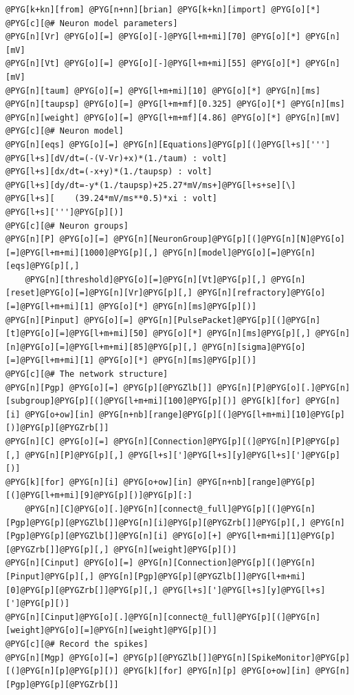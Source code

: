 \documentclass[letterpaper,10pt,english]{manual}
\begin{document}
\begin{Verbatim}[commandchars=@\[\]]
@PYG[k+kn][from] @PYG[n+nn][brian] @PYG[k+kn][import] @PYG[o][*]
@PYG[c][@# Neuron model parameters]
@PYG[n][Vr] @PYG[o][=] @PYG[o][-]@PYG[l+m+mi][70] @PYG[o][*] @PYG[n][mV]
@PYG[n][Vt] @PYG[o][=] @PYG[o][-]@PYG[l+m+mi][55] @PYG[o][*] @PYG[n][mV]
@PYG[n][taum] @PYG[o][=] @PYG[l+m+mi][10] @PYG[o][*] @PYG[n][ms]
@PYG[n][taupsp] @PYG[o][=] @PYG[l+m+mf][0.325] @PYG[o][*] @PYG[n][ms]
@PYG[n][weight] @PYG[o][=] @PYG[l+m+mf][4.86] @PYG[o][*] @PYG[n][mV]
@PYG[c][@# Neuron model]
@PYG[n][eqs] @PYG[o][=] @PYG[n][Equations]@PYG[p][(]@PYG[l+s][''']
@PYG[l+s][dV/dt=(-(V-Vr)+x)*(1./taum) : volt]
@PYG[l+s][dx/dt=(-x+y)*(1./taupsp) : volt]
@PYG[l+s][dy/dt=-y*(1./taupsp)+25.27*mV/ms+]@PYG[l+s+se][\]
@PYG[l+s][    (39.24*mV/ms**0.5)*xi : volt]
@PYG[l+s][''']@PYG[p][)]
@PYG[c][@# Neuron groups]
@PYG[n][P] @PYG[o][=] @PYG[n][NeuronGroup]@PYG[p][(]@PYG[n][N]@PYG[o][=]@PYG[l+m+mi][1000]@PYG[p][,] @PYG[n][model]@PYG[o][=]@PYG[n][eqs]@PYG[p][,]
    @PYG[n][threshold]@PYG[o][=]@PYG[n][Vt]@PYG[p][,] @PYG[n][reset]@PYG[o][=]@PYG[n][Vr]@PYG[p][,] @PYG[n][refractory]@PYG[o][=]@PYG[l+m+mi][1] @PYG[o][*] @PYG[n][ms]@PYG[p][)]
@PYG[n][Pinput] @PYG[o][=] @PYG[n][PulsePacket]@PYG[p][(]@PYG[n][t]@PYG[o][=]@PYG[l+m+mi][50] @PYG[o][*] @PYG[n][ms]@PYG[p][,] @PYG[n][n]@PYG[o][=]@PYG[l+m+mi][85]@PYG[p][,] @PYG[n][sigma]@PYG[o][=]@PYG[l+m+mi][1] @PYG[o][*] @PYG[n][ms]@PYG[p][)]
@PYG[c][@# The network structure]
@PYG[n][Pgp] @PYG[o][=] @PYG[p][@PYGZlb[]] @PYG[n][P]@PYG[o][.]@PYG[n][subgroup]@PYG[p][(]@PYG[l+m+mi][100]@PYG[p][)] @PYG[k][for] @PYG[n][i] @PYG[o+ow][in] @PYG[n+nb][range]@PYG[p][(]@PYG[l+m+mi][10]@PYG[p][)]@PYG[p][@PYGZrb[]]
@PYG[n][C] @PYG[o][=] @PYG[n][Connection]@PYG[p][(]@PYG[n][P]@PYG[p][,] @PYG[n][P]@PYG[p][,] @PYG[l+s][']@PYG[l+s][y]@PYG[l+s][']@PYG[p][)]
@PYG[k][for] @PYG[n][i] @PYG[o+ow][in] @PYG[n+nb][range]@PYG[p][(]@PYG[l+m+mi][9]@PYG[p][)]@PYG[p][:]
    @PYG[n][C]@PYG[o][.]@PYG[n][connect@_full]@PYG[p][(]@PYG[n][Pgp]@PYG[p][@PYGZlb[]]@PYG[n][i]@PYG[p][@PYGZrb[]]@PYG[p][,] @PYG[n][Pgp]@PYG[p][@PYGZlb[]]@PYG[n][i] @PYG[o][+] @PYG[l+m+mi][1]@PYG[p][@PYGZrb[]]@PYG[p][,] @PYG[n][weight]@PYG[p][)]
@PYG[n][Cinput] @PYG[o][=] @PYG[n][Connection]@PYG[p][(]@PYG[n][Pinput]@PYG[p][,] @PYG[n][Pgp]@PYG[p][@PYGZlb[]]@PYG[l+m+mi][0]@PYG[p][@PYGZrb[]]@PYG[p][,] @PYG[l+s][']@PYG[l+s][y]@PYG[l+s][']@PYG[p][)]
@PYG[n][Cinput]@PYG[o][.]@PYG[n][connect@_full]@PYG[p][(]@PYG[n][weight]@PYG[o][=]@PYG[n][weight]@PYG[p][)]
@PYG[c][@# Record the spikes]
@PYG[n][Mgp] @PYG[o][=] @PYG[p][@PYGZlb[]]@PYG[n][SpikeMonitor]@PYG[p][(]@PYG[n][p]@PYG[p][)] @PYG[k][for] @PYG[n][p] @PYG[o+ow][in] @PYG[n][Pgp]@PYG[p][@PYGZrb[]]

\end{Verbatim}
\end{document}
